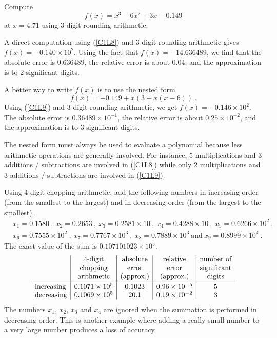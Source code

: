 \begin{egg}
Compute
\begin{equation} \label{C1L8}
f(x) = x^3 -6x^2+3x-0.149
\end{equation}
at $x=4.71$ using $3$-digit rounding arithmetic.

A direct computation using (\ref{C1L8}) and $3$-digit rounding
arithmetic gives $f(x) = -0.140 \times 10^2$.  Using the fact that
$f(x) = -14.636489$, we find that the absolute error is
$0.636489$, the relative error is about $0.04$, and the
approximation is to $2$ significant digits. 

A better way to write $f(x)$ is to use the nested form
\begin{equation} \label{C1L9}
f(x) = -0.149 +x(3 + x(x-6)) \ .
\end{equation}
Using (\ref{C1L9}) and $3$-digit rounding arithmetic, we get
$f(x) = -0.146 \times 10^2$.  The absolute error is
$0.36489 \times 10^{-1}$, the relative error is about
$0.25 \times 10^{-2}$, and the approximation is to $3$ significant
digits.

The nested form must always be used to evaluate a polynomial because
less arithmetic operations are generally involved.  For instance, 5
multiplications and 3 additions / subtractions are involved in
(\ref{C1L8}) while only 2 multiplications and 3
additions / subtractions are involved in (\ref{C1L9}).
\end{egg}

\begin{egg}
Using $4$-digit chopping arithmetic, add the following numbers in
increasing order (from the smallest to the largest) and in decreasing
order (from the largest to the smallest).
\begin{align*}
&x_1 = 0.1580 \ , \ x_2 = 0.2653 \ , \
x_3 = 0.2581 \times 10 \ , \ x_4 = 0.4288 \times 10 \ , \
x_5 = 0.6266 \times 10^2 \ , \\
&x_6 = 0.7555 \times 10^2 \ , \ x_7 = 0.7767 \times 10^3 \ ,
\ x_8 = 0.7889 \times 10^3 \ \text{and} \ x_9 = 0.8999 \times 10^4 \ .
\end{align*}
The exact value of the sum is $0.107101023 \times 10^5$.
\[
\begin{array}{l|c|c|c|c}
& \text{$4$-digit} & \text{absolute} & \text{relative} & \text{number of} \\
& \text{chopping} & \text{error} & \text{error} & \text{significant} \\
& \text{arithmetic} & \text{(approx.)} & \text{(approx.)} & \text{digits} \\
\hline
\text{increasing} & \rule{0em}{1em} 0.1071\times 10^5 & 0.1023 &
0.96 \times 10^{-5} & 5 \\
\text{decreasing} & 0.1069\times 10^5 & 20.1 &
0.19 \times 10^{-2} & 3
\end{array}
\]
The numbers $x_1$, $x_2$, $x_3$ and $x_4$ are ignored when the summation is
performed in decreasing order.  This is another example where adding a really
small number to a very large number produces a loss of accuracy.
\end{egg}


